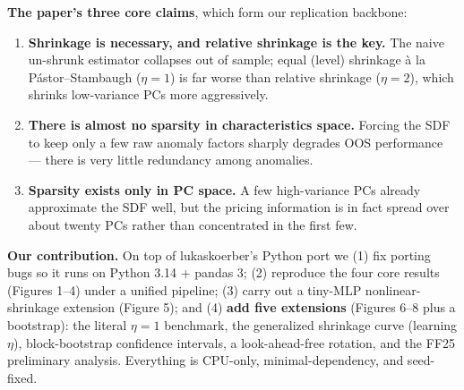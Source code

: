 \documentclass[11pt,a4paper]{article}
\begin{document}
\textbf{The paper's three core claims}, which form our replication backbone:
\begin{enumerate}
  \item \textbf{Shrinkage is necessary, and relative shrinkage is the key.} The naive un-shrunk estimator collapses
  out of sample; equal (level) shrinkage à la Pástor--Stambaugh ($\eta{=}1$) is far worse than relative
  shrinkage ($\eta{=}2$), which shrinks low-variance PCs more aggressively.
  \item \textbf{There is almost no sparsity in characteristics space.} Forcing the SDF to keep only a few raw
  anomaly factors sharply degrades OOS performance --- there is very little redundancy among anomalies.
  \item \textbf{Sparsity exists only in PC space.} A few high-variance PCs already approximate the SDF well, but
  the pricing information is in fact spread over about twenty PCs rather than concentrated in the first few.
\end{enumerate}

\textbf{Our contribution.} On top of lukaskoerber's Python port we (1) fix porting bugs so it runs on
Python 3.14 + pandas 3; (2) reproduce the four core results (Figures 1--4) under a unified pipeline; (3) carry out
a tiny-MLP nonlinear-shrinkage extension (Figure 5); and (4) \textbf{add five extensions} (Figures 6--8 plus a
bootstrap): the literal $\eta{=}1$ benchmark, the generalized shrinkage curve (learning $\eta$), block-bootstrap
confidence intervals, a look-ahead-free rotation, and the FF25 preliminary analysis. Everything is CPU-only,
minimal-dependency, and seed-fixed.

\end{document}
